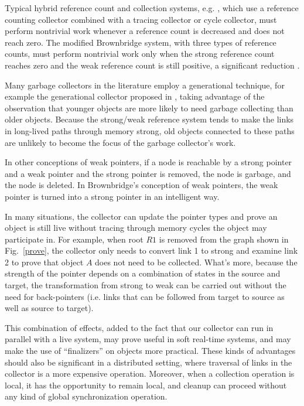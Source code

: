 
Typical hybrid reference count and collection systems, e.g. \cite{Bacon2001,Levanoni2006,Bacon:2001:JWC,Barabash2005,Lins2008}, which use a reference counting collector combined with a tracing collector or cycle collector,
must perform nontrivial work whenever a reference count is decreased and does
not reach zero. The modified Brownbridge system, with three types of reference counts, must
perform nontrivial work only when the strong reference count reaches zero and
the weak reference count is still positive, a significant reduction \cite{Brownbridge1985,Jones1996}.

Many garbage collectors in the literature employ a generational technique, for example the generational collector proposed in \cite{Printezis:2000}, taking advantage of
the observation that younger objects are more likely to need garbage collecting
than older objects. Because the strong/weak reference system tends to make the links in long-lived paths through memory
strong, old objects connected to these paths are
unlikely to become the focus of the garbage collector's work.

In other conceptions of weak pointers, if a node is reachable by a strong pointer and a weak pointer and the strong pointer is removed, the node is garbage, and the node is deleted. In Brownbridge's conception of weak pointers, the weak pointer is turned into a strong pointer in an intelligent way.

In many situations,
the collector can update the pointer types and prove an object is still live without tracing through memory
cycles the object may participate in. For example, when root $R1$ is removed from the graph shown in Fig.~\ref{prove},
the collector
only needs to convert link 1 to strong and examine link 2 to prove that object $A$ does not need
to be collected. What's more, because the strength of the pointer depends on a combination of states in
the source and target, the transformation from strong to weak can be carried out
without the need for back-pointers (i.e. links that can be followed
from target to source as well as source to target).


This combination of effects, added to the fact that our collector can
run in parallel with a live system, may prove useful in soft real-time systems,
and may make the use of ``finalizers'' on objects more practical.
These kinds of advantages should also be significant in a distributed
setting, where traversal of links in the collector is a more expensive
operation. Moreover, when a collection operation is local, it has the opportunity to
remain local, and cleanup can proceed without any kind of global synchronization
operation.

